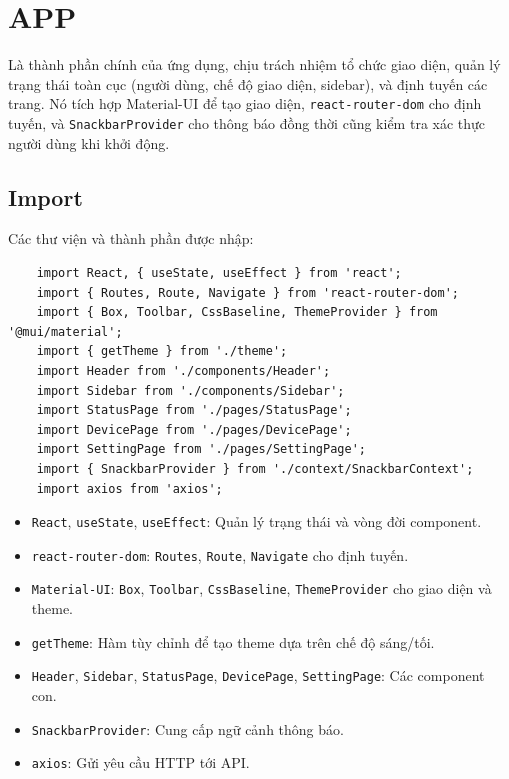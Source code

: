     \section{APP}
        \hspace*{0.6cm}Là thành phần chính của ứng dụng, chịu trách nhiệm tổ chức giao diện, quản lý trạng thái toàn cục (người dùng, chế độ giao diện, sidebar), và định tuyến các trang. Nó tích hợp Material-UI để tạo giao diện, \texttt{react-router-dom} cho định tuyến, và \texttt{SnackbarProvider} cho thông báo đồng thời cũng kiểm tra xác thực người dùng khi khởi động.
        \subsection{Import}
            \hspace*{0.6cm}Các thư viện và thành phần được nhập:
            \begin{lstlisting}
    import React, { useState, useEffect } from 'react';
    import { Routes, Route, Navigate } from 'react-router-dom';
    import { Box, Toolbar, CssBaseline, ThemeProvider } from '@mui/material';
    import { getTheme } from './theme';
    import Header from './components/Header';
    import Sidebar from './components/Sidebar';
    import StatusPage from './pages/StatusPage';
    import DevicePage from './pages/DevicePage';
    import SettingPage from './pages/SettingPage';
    import { SnackbarProvider } from './context/SnackbarContext';
    import axios from 'axios';
            \end{lstlisting}
            \begin{itemize}
                \item \texttt{React}, \texttt{useState}, \texttt{useEffect}: Quản lý trạng thái và vòng đời component.
                \item \texttt{react-router-dom}: \texttt{Routes}, \texttt{Route}, \texttt{Navigate} cho định tuyến.
                \item \texttt{Material-UI}: \texttt{Box}, \texttt{Toolbar}, \texttt{CssBaseline}, \texttt{ThemeProvider} cho giao diện và theme.
                \item \texttt{getTheme}: Hàm tùy chỉnh để tạo theme dựa trên chế độ sáng/tối.
                \item \texttt{Header}, \texttt{Sidebar}, \texttt{StatusPage}, \texttt{DevicePage}, \texttt{SettingPage}: Các component con.
                \item \texttt{SnackbarProvider}: Cung cấp ngữ cảnh thông báo.
                \item \texttt{axios}: Gửi yêu cầu HTTP tới API.
            \end{itemize}

